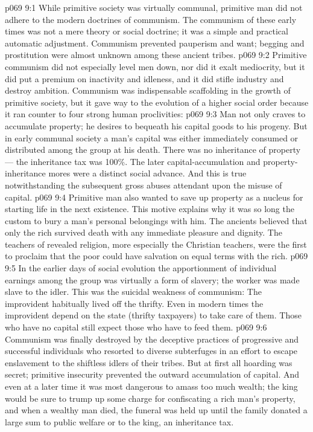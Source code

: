 \vs p069 9:1 While primitive society was virtually communal, primitive man did not adhere to the modern doctrines of communism. The communism of these early times was not a mere theory or social doctrine; it was a simple and practical automatic adjustment. Communism prevented pauperism and want; begging and prostitution were almost unknown among these ancient tribes.
\vs p069 9:2 \pc Primitive communism did not especially level men down, nor did it exalt mediocrity, but it did put a premium on inactivity and idleness, and it did stifle industry and destroy ambition. Communism was indispensable scaffolding in the growth of primitive society, but it gave way to the evolution of a higher social order because it ran counter to four strong human proclivities:
\vs p069 9:3 \bibnobreakspace {} Man not only craves to accumulate property; he desires to bequeath his capital goods to his progeny. But in early communal society a man’s capital was either immediately consumed or distributed among the group at his death. There was no inheritance of property --- the inheritance tax was 100\%. The later capital\hyp{}accumulation and property\hyp{}inheritance mores were a distinct social advance. And this is true notwithstanding the subsequent gross abuses attendant upon the misuse of capital.
\vs p069 9:4 \bibnobreakspace {} Primitive man also wanted to save up property as a nucleus for starting life in the next existence. This motive explains why it was so long the custom to bury a man’s personal belongings with him. The ancients believed that only the rich survived death with any immediate pleasure and dignity. The teachers of revealed religion, more especially the Christian teachers, were the first to proclaim that the poor could have salvation on equal terms with the rich.
\vs p069 9:5 \bibnobreakspace {} In the earlier days of social evolution the apportionment of individual earnings among the group was virtually a form of slavery; the worker was made slave to the idler. This was the suicidal weakness of communism: The improvident habitually lived off the thrifty. Even in modern times the improvident depend on the state (thrifty taxpayers) to take care of them. Those who have no capital still expect those who have to feed them.
\vs p069 9:6 \bibnobreakspace {} Communism was finally destroyed by the deceptive practices of progressive and successful individuals who resorted to diverse subterfuges in an effort to escape enslavement to the shiftless idlers of their tribes. But at first all hoarding was secret; primitive insecurity prevented the outward accumulation of capital. And even at a later time it was most dangerous to amass too much wealth; the king would be sure to trump up some charge for confiscating a rich man’s property, and when a wealthy man died, the funeral was held up until the family donated a large sum to public welfare or to the king, an inheritance tax.
